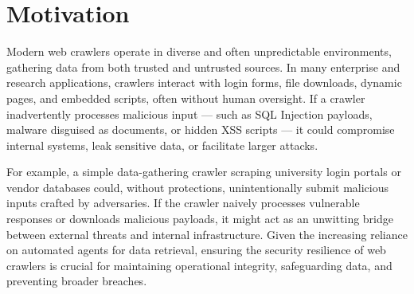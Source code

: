 \section{Motivation}
Modern web crawlers operate in diverse and often unpredictable environments, gathering data from both trusted and untrusted sources. In many enterprise and research applications, crawlers interact with login forms, file downloads, dynamic pages, and embedded scripts, often without human oversight. If a crawler inadvertently processes malicious input — such as SQL Injection payloads, malware disguised as documents, or hidden XSS scripts — it could compromise internal systems, leak sensitive data, or facilitate larger attacks.

For example, a simple data-gathering crawler scraping university login portals or vendor databases could, without protections, unintentionally submit malicious inputs crafted by adversaries. If the crawler naively processes vulnerable responses or downloads malicious payloads, it might act as an unwitting bridge between external threats and internal infrastructure. Given the increasing reliance on automated agents for data retrieval, ensuring the security resilience of web crawlers is crucial for maintaining operational integrity, safeguarding data, and preventing broader breaches.
